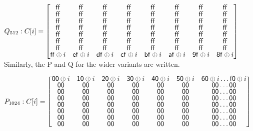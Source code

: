     $Q_{512}: C[i] = \renewcommand\arraystretch{0.75}
    \begin{bmatrix}
      \mathsf{ff} & \mathsf{ff} & \mathsf{ff} & \mathsf{ff} & \mathsf{ff} & \mathsf{ff} & \mathsf{ff} & \mathsf{ff} \\
      \mathsf{ff} & \mathsf{ff} & \mathsf{ff} & \mathsf{ff} & \mathsf{ff} & \mathsf{ff} & \mathsf{ff} & \mathsf{ff} \\
      \mathsf{ff} & \mathsf{ff} & \mathsf{ff} & \mathsf{ff} & \mathsf{ff} & \mathsf{ff} & \mathsf{ff} & \mathsf{ff} \\
      \mathsf{ff} & \mathsf{ff} & \mathsf{ff} & \mathsf{ff} & \mathsf{ff} & \mathsf{ff} & \mathsf{ff} & \mathsf{ff} \\
      \mathsf{ff} & \mathsf{ff} & \mathsf{ff} & \mathsf{ff} & \mathsf{ff} & \mathsf{ff} & \mathsf{ff} & \mathsf{ff} \\
      \mathsf{ff} & \mathsf{ff} & \mathsf{ff} & \mathsf{ff} & \mathsf{ff} & \mathsf{ff} & \mathsf{ff} & \mathsf{ff} \\
      \mathsf{ff} & \mathsf{ff} & \mathsf{ff} & \mathsf{ff} & \mathsf{ff} & \mathsf{ff} & \mathsf{ff} & \mathsf{ff} \\
      \mathsf{ff} \oplus i & \mathsf{ef} \oplus i & \mathsf{df} \oplus i & \mathsf{cf} \oplus i & \mathsf{bf} \oplus i & \mathsf{af} \oplus i & \mathsf{9f} \oplus i & \mathsf{8f} \oplus i 
    \end{bmatrix}$ \\
    
    Similarly, the P and Q for the wider variants are written.

    $ P_{1024}: C[i] = \renewcommand\arraystretch{0.75}
    \begin{bmatrix}
      \mathsf{00} \oplus i & \mathsf{10} \oplus i & \mathsf{20} \oplus i & \mathsf{30} \oplus i & \mathsf{40} \oplus i & \mathsf{50} \oplus i & \mathsf{60} \oplus i \ldots \mathsf{f0} \oplus i \\
      \mathsf{00} & \mathsf{00} & \mathsf{00} & \mathsf{00} & \mathsf{00} & \mathsf{00} & \mathsf{00} \dots \mathsf{00} \\
      \mathsf{00} & \mathsf{00} & \mathsf{00} & \mathsf{00} & \mathsf{00} & \mathsf{00} & \mathsf{00} \dots \mathsf{00} \\
      \mathsf{00} & \mathsf{00} & \mathsf{00} & \mathsf{00} & \mathsf{00} & \mathsf{00} & \mathsf{00} \dots \mathsf{00} \\
      \mathsf{00} & \mathsf{00} & \mathsf{00} & \mathsf{00} & \mathsf{00} & \mathsf{00} & \mathsf{00} \dots \mathsf{00} \\
      \mathsf{00} & \mathsf{00} & \mathsf{00} & \mathsf{00} & \mathsf{00} & \mathsf{00} & \mathsf{00} \dots \mathsf{00} \\
      \mathsf{00} & \mathsf{00} & \mathsf{00} & \mathsf{00} & \mathsf{00} & \mathsf{00} & \mathsf{00} \dots \mathsf{00} \\
      \mathsf{00} & \mathsf{00} & \mathsf{00} & \mathsf{00} & \mathsf{00} & \mathsf{00} & \mathsf{00} \dots \mathsf{00} \\
    \end{bmatrix}$

